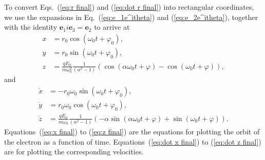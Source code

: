 \documentclass[twocolumn,showpacs,preprintnumbers,amsmath,amssymb]{revtex4}
\begin{document}
To convert Eqs.~(\ref{eq:r final}) and (\ref{eq:dot r final}) into rectangular coordinates, we use the expansions in Eq.~(\ref{eq:e_1e^itheta}) and (\ref{eq:e_2e^itheta}), together with the identity $\mathbf e_1 i \mathbf e_3  = \mathbf e_2$ %
to arrive at
\begin{subequations}
\begin{align}
\label{eq:x final}
x &= r_0\cos(\omega_0 t + \varphi_0),\\
\label{eq:y final}
y &= r_0\sin(\omega_0 t + \varphi_0),\\
\label{eq:z final}
z &= \frac{qE_0}{m\omega_0^2}\frac{1}{(\alpha^2 - 1)}(\cos(\alpha\omega_0 t +\varphi) - \cos(\omega_0t +\varphi)), 
\end{align}
\end{subequations}
and 
\begin{subequations}
\begin{align}
\label{eq:dot x final}
\dot x &= -r_0\omega_0\sin(\omega_0 t + \varphi_0),\\
\label{eq:dot y final}
\dot y &= r_0\omega_0\cos(\omega_0 t + \varphi_0),\\
\label{eq:dot z final}
\dot z &= \frac{qE_0}{m\omega_0}\frac{1}{(\alpha^2 - 1)}(-\alpha\sin(\alpha\omega_0 t +\varphi) + \sin(\omega_0t +\varphi)).
\end{align}
\end{subequations}
Equations~(\ref{eq:x final}) to (\ref{eq:z final}) are the equations for plotting the orbit of the electron as a function of time.  Equations~(\ref{eq:dot x final}) to (\ref{eq:dot z final}) are for plotting the corresponding velocities.
\end{document}
